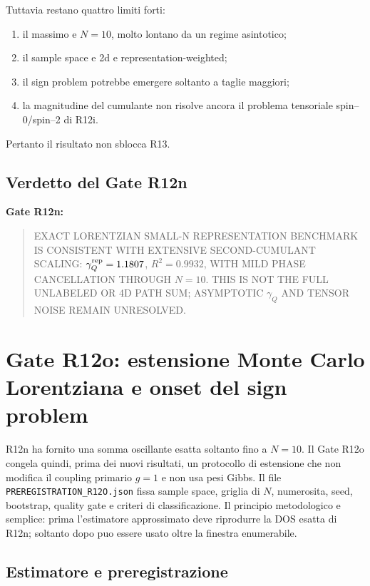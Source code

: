 \documentclass[11pt,a4paper]{article}
\newcommand{\status}[1]{\textsf{#1}}
\begin{document}
Tuttavia restano quattro limiti forti:
\begin{enumerate}
\item il massimo e $N=10$, molto lontano da un regime asintotico;
\item il sample space e 2d e representation-weighted;
\item il sign problem potrebbe emergere soltanto a taglie maggiori;
\item la magnitudine del cumulante non risolve ancora il problema tensoriale spin--0/spin--2 di R12i.
\end{enumerate}
Pertanto il risultato non sblocca R13.

\subsection{Verdetto del Gate R12n}

\textbf{Gate R12n:}
\begin{quote}
\status{EXACT LORENTZIAN SMALL-N REPRESENTATION BENCHMARK IS CONSISTENT WITH EXTENSIVE SECOND-CUMULANT SCALING: $\gamma_Q^{\rm rep}=1.1807$, $R^2=0.9932$, WITH MILD PHASE CANCELLATION THROUGH $N=10$. THIS IS NOT THE FULL UNLABELED OR 4D PATH SUM; ASYMPTOTIC $\gamma_Q$ AND TENSOR NOISE REMAIN UNRESOLVED.}

\end{quote}

\section{Gate R12o: estensione Monte Carlo Lorentziana e onset del sign problem}

R12n ha fornito una somma oscillante esatta soltanto fino a $N=10$. Il Gate R12o congela quindi, prima dei nuovi risultati, un protocollo di estensione che non modifica il coupling primario $g=1$ e non usa pesi Gibbs. Il file \texttt{PREREGISTRATION\_R12O.json} fissa sample space, griglia di $N$, numerosita, seed, bootstrap, quality gate e criteri di classificazione. Il principio metodologico e semplice: prima l'estimatore approssimato deve riprodurre la DOS esatta di R12n; soltanto dopo puo essere usato oltre la finestra enumerabile.

\subsection{Estimatore e preregistrazione}
\end{document}
